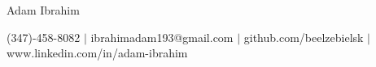 \documentclass{article}
\newcommand{\name}[1]{{\huge #1} \vspace{10pt}}
\begin{document}


\begin{center}
	\name{Adam Ibrahim}

	(347)-458-8082 $|$
	ibrahimadam193@gmail.com  $|$
	github.com/beelzebielsk  $|$
	www.linkedin.com/in/adam-ibrahim
\end{center}
\end{document}

